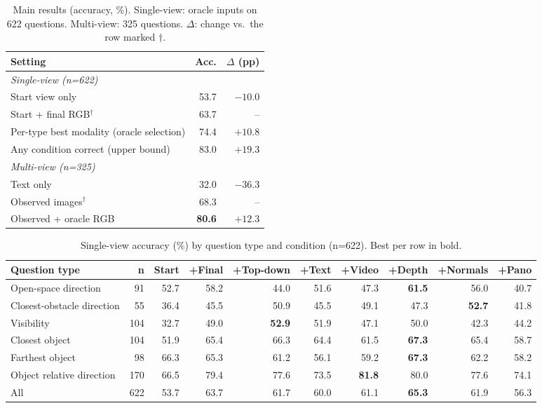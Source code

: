 \begin{table}[t]
\centering
\caption{Main results (accuracy, \%). Single-view: oracle inputs on 622 questions.
Multi-view: 325 questions. $\Delta$: change vs.\ the row marked $\dagger$.}
\label{tab:main}
\begin{tabular}{lrr}
\toprule
Setting & Acc. & $\Delta$ (pp) \\
\midrule
\multicolumn{3}{l}{\emph{Single-view (n=622)}} \\
Start view only                           & 53.7 & $-10.0$ \\
Start + final RGB$^\dagger$               & 63.7 & --      \\
Per-type best modality (oracle selection) & 74.4 & $+10.8$ \\
Any condition correct (upper bound)       & 83.0 & $+19.3$ \\
\midrule
\multicolumn{3}{l}{\emph{Multi-view (n=325)}} \\
Text only                                 & 32.0 & $-36.3$ \\
Observed images$^\dagger$                 & 68.3 & --      \\
Observed + oracle RGB                     & \textbf{80.6} & $+12.3$ \\
\bottomrule
\end{tabular}
\end{table}

\begin{table}[t]
\centering
\caption{Single-view accuracy (\%) by question type and condition (n=622). Best per row in bold.}
\label{tab:sv_type}
\begin{tabular}{lrrrrrrrrr}
\toprule
Question type & n & Start & +Final & +Top-down & +Text & +Video & +Depth & +Normals & +Pano \\
\midrule
Open-space direction       &  91 & 52.7 & 58.2 & 44.0 & 51.6 & 47.3 & \textbf{61.5} & 56.0 & 40.7 \\
Closest-obstacle direction &  55 & 36.4 & 45.5 & 50.9 & 45.5 & 49.1 & 47.3 & \textbf{52.7} & 41.8 \\
Visibility                 & 104 & 32.7 & 49.0 & \textbf{52.9} & 51.9 & 47.1 & 50.0 & 42.3 & 44.2 \\
Closest object             & 104 & 51.9 & 65.4 & 66.3 & 64.4 & 61.5 & \textbf{67.3} & 65.4 & 58.7 \\
Farthest object            &  98 & 66.3 & 65.3 & 61.2 & 56.1 & 59.2 & \textbf{67.3} & 62.2 & 58.2 \\
Object relative direction  & 170 & 66.5 & 79.4 & 77.6 & 73.5 & \textbf{81.8} & 80.0 & 77.6 & 74.1 \\
\midrule
All                        & 622 & 53.7 & 63.7 & 61.7 & 60.0 & 61.1 & \textbf{65.3} & 61.9 & 56.3 \\
\bottomrule
\end{tabular}
\end{table}

